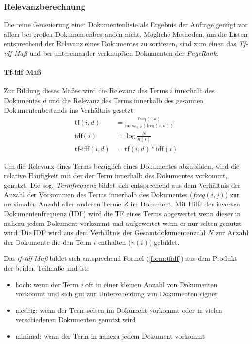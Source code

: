 \subsubsection{Relevanzberechnung}\label{sec:searchrelevance}\label{tfidf}
Die reine Generierung einer Dokumentenliste als Ergebnis der Anfrage genügt vor allem bei großen Dokumentenbeständen nicht. Mögliche Methoden, um die Listen  entsprechend der Relevanz eines Dokumentes zu sortieren, sind zum einen das \textit{Tf-idf Maß} und bei untereinander verknüpften Dokumenten der \textit{PageRank}.

\paragraph{Tf-idf Maß} Zur Bildung dieses Maßes wird die Relevanz des Terms $i$ innerhalb des Dokumentes $d$ und die Relevanz des Terms innerhalb des gesamten Dokumentenbestands ins Verhältnis gesetzt.
\begin{align}
\text{tf}(i, d) & = \frac{\text{freq}(i, d)}{\text{max}_{z \in Z}(\text{freq}(z, d))} \\
\text{idf}(i) & = \log{\frac{N}{n(i)}} \\
\text{tf-idf}(i, d) & = \text{tf}(i ,d) \ast \text{idf}(i) \label{form:tfidf}
\end{align}

Um die Relevanz eines Terms bezüglich eines Dokumentes abzubilden, wird die relative Häufigkeit mit der der Term innerhalb des Dokumentes vorkommt, genutzt. Die sog. \textit{Termfrequenz} bildet sich entsprechend aus dem Verhältnis der Anzahl der Vorkommen des Terms innerhalb des Dokumentes ($freq(i,j)$) zur maximalen Anzahl aller anderen Terme $Z$ im Dokument. Mit Hilfe der inversen Dokumentenfrequenz (\acs{IDF}) wird die \acf{TF} eines Terms abgewertet wenn dieser in nahezu jedem Dokument vorkommt und aufgewertet wenn er nur selten genutzt wird. Die \acs{IDF} wird aus dem Verhältnis der Gesamtdokumentenzahl $N$ zur Anzahl der Dokumente die den Term $i$ enthalten ($n(i)$) gebildet.

Das \textit{tf-idf Maß} bildet sich entsprechend Formel (\ref{form:tfidf}) aus dem Produkt der beiden Teilmaße und ist:
\begin{itemize}
\item hoch: wenn der Term $i$ oft in einer kleinen Anzahl von Dokumenten vorkommt und sich gut zur Unterscheidung von Dokumenten eignet
\item niedrig: wenn der Term selten im Dokument vorkommt oder in vielen verschiedenen Dokumenten genutzt wird
\item minimal: wenn der Term in nahezu jedem Dokument vorkommt
\end{itemize}

